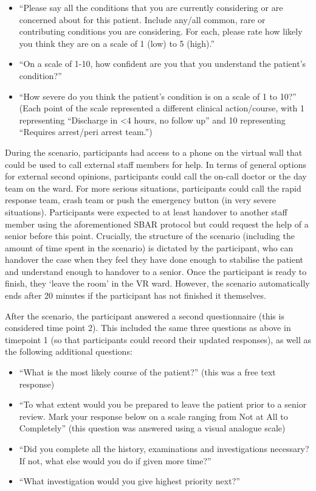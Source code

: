 \documentclass[a4paper, nobind]{templates/ociamthesis}
\providecommand{\tightlist}{%
  \setlength{\itemsep}{0pt}\setlength{\parskip}{0pt}}
\begin{document}
\begin{itemize}
\tightlist
\item
  ``Please say all the conditions that you are currently considering or are concerned about for this patient. Include any/all common, rare or contributing conditions you are considering. For each, please rate how likely you think they are on a scale of 1 (low) to 5 (high).''
\item
  ``On a scale of 1-10, how confident are you that you understand the patient's condition?''
\item
  ``How severe do you think the patient's condition is on a scale of 1 to 10?'' (Each point of the scale represented a different clinical action/course, with 1 representing ``Discharge in \textless4 hours, no follow up'' and 10 representing ``Requires arrest/peri arrest team.'')
\end{itemize}

During the scenario, participants had access to a phone on the virtual wall that could be used to call external staff members for help. In terms of general options for external second opinions, participants could call the on-call doctor or the day team on the ward. For more serious situations, participants could call the rapid response team, crash team or push the emergency button (in very severe situations). Participants were expected to at least handover to another staff member using the aforementioned SBAR protocol but could request the help of a senior before this point. Crucially, the structure of the scenario (including the amount of time spent in the scenario) is dictated by the participant, who can handover the case when they feel they have done enough to stabilise the patient and understand enough to handover to a senior. Once the participant is ready to finish, they `leave the room' in the VR ward. However, the scenario automatically ends after 20 minutes if the participant has not finished it themselves.

\hfill\break
After the scenario, the participant answered a second questionnaire (this is considered time point 2). This included the same three questions as above in timepoint 1 (so that participants could record their updated responses), as well as the following additional questions:

\begin{itemize}
\tightlist
\item
  ``What is the most likely course of the patient?'' (this was a free text response)
\item
  ``To what extent would you be prepared to leave the patient prior to a senior review. Mark your response below on a scale ranging from Not at All to Completely'' (this question was answered using a visual analogue scale)
\item
  ``Did you complete all the history, examinations and investigations necessary? If not, what else would you do if given more time?''
\item
  ``What investigation would you give highest priority next?''
\end{itemize}
\end{document}
